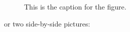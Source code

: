 \begin{figure}[!ht]
\centering
{}
\caption{This is the caption for the figure.}
\label{fig:Pict}
\end{figure}

or two side-by-side pictures:

